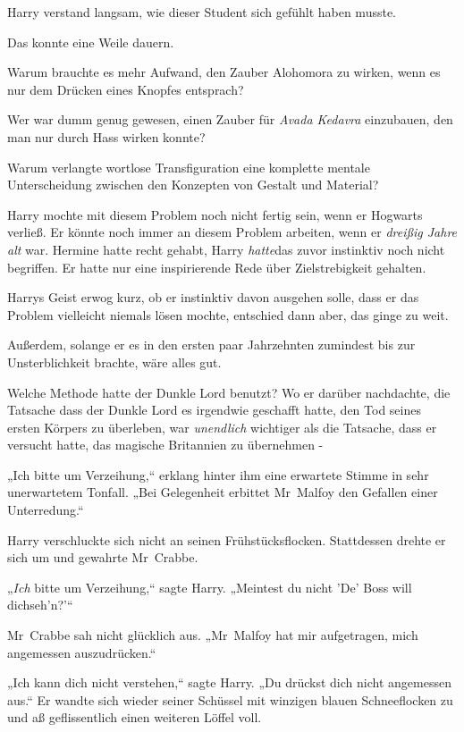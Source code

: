 {Harry verstand langsam, wie dieser Student sich gefühlt haben musste.

Das konnte eine Weile dauern.

Warum brauchte es mehr Aufwand, den Zauber Alohomora zu wirken, wenn es nur dem Drücken eines Knopfes entsprach?

Wer war dumm genug gewesen, einen Zauber für \emph{Avada Kedavra} einzubauen, den man nur durch Hass wirken konnte?

Warum verlangte wortlose Transfiguration eine komplette mentale Unterscheidung zwischen den Konzepten von Gestalt und Material?

Harry mochte mit diesem Problem noch nicht fertig sein, wenn er Hogwarts verließ. Er könnte noch immer an diesem Problem arbeiten, wenn er \emph{dreißig Jahre alt} war. Hermine hatte recht gehabt, Harry \emph{hatte}das zuvor instinktiv noch nicht begriffen. Er hatte nur eine inspirierende Rede über Zielstrebigkeit gehalten.

Harrys Geist erwog kurz, ob er instinktiv davon ausgehen solle, dass er das Problem vielleicht niemals lösen mochte, entschied dann aber, das ginge zu weit.

Außerdem, solange er es in den ersten paar Jahrzehnten zumindest bis zur Unsterblichkeit brachte, wäre alles gut.

Welche Methode hatte der Dunkle Lord benutzt? Wo er darüber nachdachte, die Tatsache dass der Dunkle Lord es irgendwie geschafft hatte, den Tod seines ersten Körpers zu überleben, war \emph{unendlich} wichtiger als die Tatsache, dass er versucht hatte, das magische Britannien zu übernehmen -

„Ich bitte um Verzeihung,“ erklang hinter ihm eine erwartete Stimme in sehr unerwartetem Tonfall. „Bei Gelegenheit erbittet Mr~Malfoy den Gefallen einer Unterredung.“

Harry verschluckte sich nicht an seinen Frühstücksflocken. Stattdessen drehte er sich um und gewahrte Mr~Crabbe.

„\emph{Ich} bitte um Verzeihung,“ sagte Harry. „Meintest du nicht 'De' Boss will dichseh'n?'“

Mr~Crabbe sah nicht glücklich aus. „Mr~Malfoy hat mir aufgetragen, mich angemessen auszudrücken.“

„Ich kann dich nicht verstehen,“ sagte Harry. „Du drückst dich nicht angemessen aus.“ Er wandte sich wieder seiner Schüssel mit winzigen blauen Schneeflocken zu und aß geflissentlich einen weiteren Löffel voll.

}
